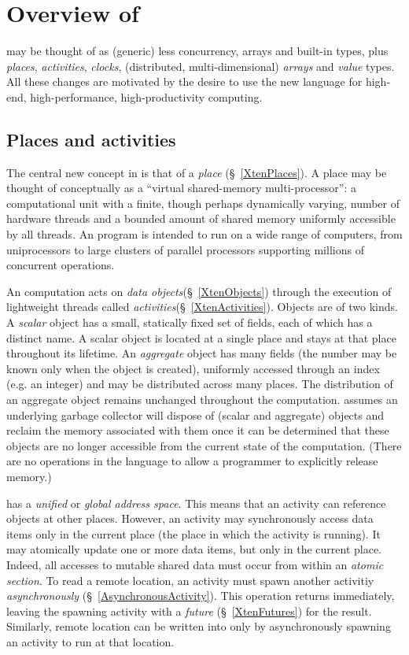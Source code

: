 \chapter{Overview of \Xten}

\Xten{} may be thought of as (generic) \java{} less concurrency, arrays and built-in types,  plus {\em places}, {\em activities}, {\em clocks}, (distributed,
multi-dimensional) {\em arrays} and {\em value} types. All these changes are
motivated by the desire to use the new language for high-end,
high-performance, high-productivity computing.

\section{Places and activities}
The central new concept in \Xten{} is that of a {\em place}
(\S~\ref{XtenPlaces}).  A place may be thought of conceptually as a
``virtual shared-memory multi-processor'': a computational unit with a
finite, though perhaps dynamically varying, number of hardware threads
and a bounded amount of shared memory uniformly accessible by all
threads.  An \Xten{} program is intended to run 
on a wide range of computers, from uniprocessors to large clusters
of parallel processors supporting millions of concurrent operations.

An \Xten{} computation acts on {\em data
objects}(\S~\ref{XtenObjects}) through the execution of lightweight
threads called {\em activities}(\S~\ref{XtenActivities}).  Objects are
of two kinds. A {\em scalar} object has a small, statically fixed set
of fields, each of which has a distinct name. A scalar object is
located at a single place and stays at that place throughout its
lifetime.  An {\em aggregate} object has many fields (the number may
be known only when the object is created), uniformly accessed through
an index (e.g.{} an integer) and may be distributed across many
places. The distribution of an aggregate object remains unchanged
throughout the computation. \Xten{} assumes an underlying garbage
collector will dispose of (scalar and aggregate) objects and reclaim
the memory associated with them once it can be determined that these
objects are no longer accessible from the current state of the
computation. (There are no operations in the language to allow a
programmer to explicitly release memory.)

{}\Xten{} has a {\em unified} or {\em global address space}. This
means that an activity can reference objects at other places.
However, an activity may synchronously access data items only in the
current place (the place in which the activity is running). It may
atomically update one or more data items, but only in the current
place.  Indeed, all accesses to mutable shared data must occur from
within an {\em atomic section}. To read a remote location, an activity
must spawn another activitiy {\em asynchronously}
(\S~\ref{AsynchronousActivity}). This operation returns immediately,
leaving the spawning activity with a {\em future}
(\S~\ref{XtenFutures}) for the result. Similarly, remote location can
be written into only by asynchronously spawning an activity to run at
that location.

